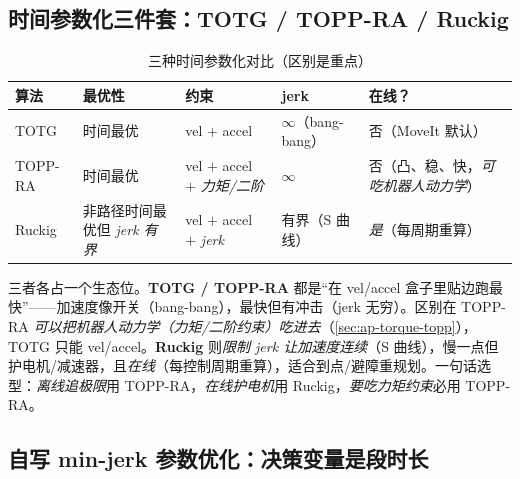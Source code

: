 \subsection{时间参数化三件套：TOTG / TOPP-RA / Ruckig}
\label{sec:ap-timeparam}

\begin{table}[H]\centering\small
\caption{三种时间参数化对比（区别是重点）}
\begin{tabular}{p{} p{} p{} p{} p{}}
\toprule
算法 & 最优性 & 约束 & jerk & 在线？ \\
\midrule
TOTG\cite{kunz2012totg} & 时间最优 & vel $+$ accel & $\infty$（bang-bang）& 否（MoveIt 默认）\\
TOPP-RA\cite{pham2018toppra} & 时间最优 & vel $+$ accel $+$ \emph{力矩/二阶} & $\infty$ & 否（凸、稳、快，\emph{可吃机器人动力学}）\\
Ruckig\cite{berscheid2021ruckig} & 非路径时间最优但 \emph{jerk 有界} & vel $+$ accel $+$ \emph{jerk} & 有界（S 曲线）& \emph{是}（每周期重算）\\
\bottomrule
\end{tabular}
\label{tab:ap-timeparam}
\end{table}

\begin{insight}\label{ins:ap-timeparam}
三者各占一个生态位。\textbf{TOTG / TOPP-RA} 都是“在 vel/accel 盒子里贴边跑最快”——加速度像开关（bang-bang），最快但有冲击（jerk 无穷）。区别在 TOPP-RA \emph{可以把机器人动力学（力矩/二阶约束）吃进去}（\cref{sec:ap-torque-topp}），TOTG 只能 vel/accel。\textbf{Ruckig} 则\emph{限制 jerk 让加速度连续}（S 曲线），慢一点但护电机/减速器，且\emph{在线}（每控制周期重算），适合到点/避障重规划。一句话选型：\emph{离线追极限}用 TOPP-RA，\emph{在线护电机}用 Ruckig，\emph{要吃力矩约束}必用 TOPP-RA。
\end{insight}

\subsection{自写 min-jerk 参数优化：决策变量是段时长}
\label{sec:ap-minjerk}

